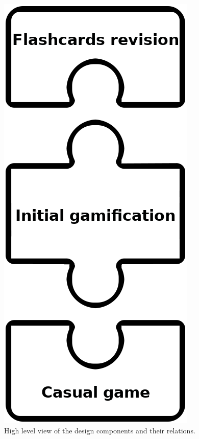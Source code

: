 \begin{figure}[htb]
    \vskip 5mm
        \begin{center}
            \includegraphics[scale=0.4]{./Figures/design.png}
            \caption{High level view of the design components and their relations.}
            \label{fig:game-elem-cards}
        \end{center}
    \vskip -5mm
\end{figure}


